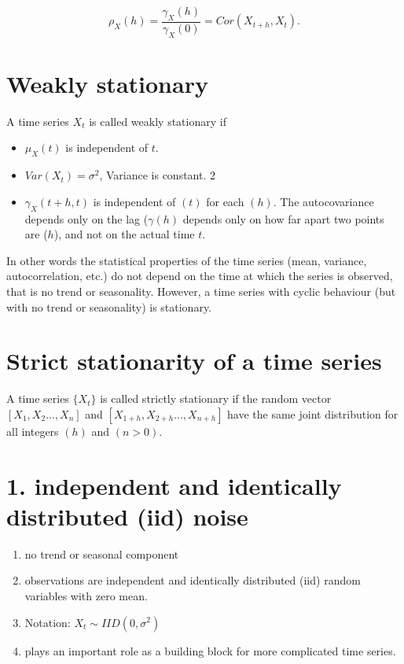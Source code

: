 \documentclass[
  11pt,
  a4paper,
]{report}
\begin{document}
\[\rho_X(h)=\frac{\gamma_X(h)}{\gamma_X(0)}=Cor(X_{t+h}, X_t).\]

\section{Weakly stationary}\label{weakly-stationary}

A time series \({X_t}\) is called weakly stationary if

\begin{itemize}
\item
  \(\mu_X(t)\) is independent of \(t\).
\item
  \(Var(X_t) = \sigma^2\), Variance is constant. 2
\item
  \(\gamma_X(t+h, t)\) is independent of \((t)\) for each \((h)\). The
  autocovariance depends only on the lag (\(\gamma(h)\) depends only on
  how far apart two points are (\(h\)), and not on the actual time
  \(t\).
\end{itemize}

In other words the statistical properties of the time series (mean,
variance, autocorrelation, etc.) do not depend on the time at which the
series is observed, that is no trend or seasonality. However, a time
series with cyclic behaviour (but with no trend or seasonality) is
stationary.

\section{Strict stationarity of a time
series}\label{strict-stationarity-of-a-time-series}

A time series \(\{X_t\}\) is called strictly stationary if the random
vector \([X_1, X_2..., X_n]\) and \([X_{1+h}, X_{2+h}..., X_{n+h}]\)
have the same joint distribution for all integers \((h)\) and
\((n > 0)\).

\section{1. independent and identically distributed (iid)
noise}\label{independent-and-identically-distributed-iid-noise}

\begin{enumerate}
\def\labelenumi{\arabic{enumi}.}
\item
  no trend or seasonal component
\item
  observations are independent and identically distributed (iid) random
  variables with zero mean.
\item
  Notation: \({X_t} \sim IID(0, \sigma^2)\)
\item
  plays an important role as a building block for more complicated time
  series.
\end{enumerate}
\end{document}

